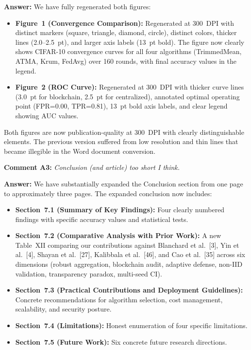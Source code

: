 \documentclass[12pt,a4paper,onecolumn]{article}
\begin{document}
\noindent\textbf{Answer:} We have fully regenerated both figures:

\begin{itemize}
    \item \textbf{Figure~1 (Convergence Comparison):} Regenerated at 300~DPI with distinct markers (square, triangle, diamond, circle), distinct colors, thicker lines (2.0--2.5~pt), and larger axis labels (13~pt bold). The figure now clearly shows CIFAR-10 convergence curves for all four algorithms (TrimmedMean, ATMA, Krum, FedAvg) over 160 rounds, with final accuracy values in the legend.
    
    \item \textbf{Figure~2 (ROC Curve):} Regenerated at 300~DPI with thicker curve lines (3.0~pt for blockchain, 2.5~pt for centralized), annotated optimal operating point (FPR=0.00, TPR=0.81), 13~pt bold axis labels, and clear legend showing AUC values.
\end{itemize}

Both figures are now publication-quality at 300~DPI with clearly distinguishable elements. The previous version suffered from low resolution and thin lines that became illegible in the Word document conversion.

\bigskip

\noindent\textbf{Comment A3:} \textit{Conclusion (and article) too short I think.}

\noindent\textbf{Answer:} We have substantially expanded the Conclusion section from one page to approximately three pages. The expanded conclusion now includes:

\begin{itemize}
    \item \textbf{Section~7.1 (Summary of Key Findings):} Four clearly numbered findings with specific accuracy values and statistical tests.
    \item \textbf{Section~7.2 (Comparative Analysis with Prior Work):} A new Table~XII comparing our contributions against Blanchard et al.~[3], Yin et al.~[4], Shayan et al.~[27], Kalibbala et al.~[46], and Cao et al.~[35] across six dimensions (robust aggregation, blockchain audit, adaptive defense, non-IID validation, transparency paradox, multi-seed CI).
    \item \textbf{Section~7.3 (Practical Contributions and Deployment Guidelines):} Concrete recommendations for algorithm selection, cost management, scalability, and security posture.
    \item \textbf{Section~7.4 (Limitations):} Honest enumeration of four specific limitations.
    \item \textbf{Section~7.5 (Future Work):} Six concrete future research directions.
\end{itemize}
\end{document}
